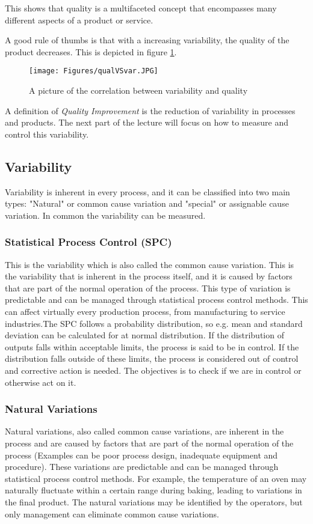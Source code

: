 This shows that quality is a multifaceted concept that encompasses many different aspects of a product or service.

A good rule of thumbs is that with a increasing variability, the quality of the product decreases. This is depicted in figure \ref{fig:qualVSvar}.
\begin{figure}[h]
    \centering
    \texttt{[image: Figures/qualVSvar.JPG]}
    \caption{A picture of the correlation between variability and quality}
    \label{fig:qualVSvar}
\end{figure}

\vspace{2\baselineskip}

A definition of \textit{Quality Improvement} is the reduction of variability in processes and products. The next part of the lecture will focus on how to measure and control this variability.

\subsection{Variability}    
Variability is inherent in every process, and it can be classified into two main types: "Natural" or common cause variation and "special" or assignable cause variation. In common the variability can be measured. 
\subsubsection{Statistical Process Control (SPC)}
This is the variability which is also called the common cause variation. This is the variability that is inherent in the process itself, and it is caused by factors that are part of the normal operation of the process. This type of variation is predictable and can be managed through statistical process control methods. This can affect virtually every production process, from manufacturing to service industries.The SPC follows a probability distribution, so e.g. mean and standard deviation can be calculated for at normal distribution. If the distribution of outputs falls within acceptable limits, the process is said to be in control. If the distribution falls outside of these limits, the process is considered out of control and corrective action is needed. The objectives is to check if we are in control or otherwise act on it.

\subsubsection{Natural Variations}
Natural variations, also called common cause variations, are inherent in the process and are caused by factors that are part of the normal operation of the process (Examples can be poor process design, inadequate equipment and procedure). These variations are predictable and can be managed through statistical process control methods. For example, the temperature of an oven may naturally fluctuate within a certain range during baking, leading to variations in the final product. The natural variations may be identified by the operators, but only management can eliminate common cause variations.

